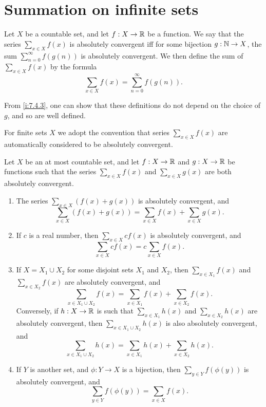 \section{Summation on infinite sets}\label{i:sec:8.2}

\begin{defn}\label{i:8.2.1}
  Let \(X\) be a countable set, and let \(f : X \to \mathbb{R}\) be a function.
  We say that the series \(\sum_{x \in X} f(x)\) is absolutely convergent iff for some bijection \(g : \mathbb{N} \to X\), the sum \(\sum_{n = 0}^\infty f(g(n))\) is absolutely convergent.
  We then define the sum of \(\sum_{x \in X} f(x)\) by the formula
  \[
    \sum_{x \in X} f(x) = \sum_{n = 0}^\infty f(g(n)).
  \]
\end{defn}

\begin{note}
  From \cref{i:7.4.3}, one can show that these definitions do not depend on the choice of \(g\), and so are well defined.
\end{note}

\begin{note}
  For finite sets \(X\) we adopt the convention that series \(\sum_{x \in X} f(x)\) are automatically considered to be absolutely convergent.
\end{note}

\begin{ac}\label{i:ac:8.2.1}
  Let \(X\) be an at most countable set, and let \(f : X \to \mathbb{R}\) and \(g : X \to \mathbb{R}\) be functions such that the series \(\sum_{x \in X} f(x)\) and \(\sum_{x \in X} g(x)\) are both absolutely convergent.
  \begin{enumerate}
    \item The series \(\sum_{x \in X} (f(x) + g(x))\) is absolutely convergent, and
          \[
            \sum_{x \in X} (f(x) + g(x)) = \sum_{x \in X} f(x) + \sum_{x \in X} g(x).
          \]
    \item If \(c\) is a real number, then \(\sum_{x \in X} cf(x)\) is absolutely convergent, and
          \[
            \sum_{x \in X} cf(x) = c \sum_{x \in X} f(x).
          \]
    \item If \(X = X_1 \cup X_2\) for some disjoint sets \(X_1\) and \(X_2\), then \(\sum_{x \in X_1} f(x)\) and \\
          \(\sum_{x \in X_2} f(x)\) are absolutely convergent, and
          \[
            \sum_{x \in X_1 \cup X_2} f(x) = \sum_{x \in X_1} f(x) + \sum_{x \in X_2} f(x).
          \]
          Conversely, if \(h : X \to \mathbb{R}\) is such that \(\sum_{x \in X_1} h(x)\) and \(\sum_{x \in X_2} h(x)\) are absolutely convergent, then \(\sum_{x \in X_1 \cup X_2} h(x)\) is also absolutely convergent, and
          \[
            \sum_{x \in X_1 \cup X_2} h(x) = \sum_{x \in X_1} h(x) + \sum_{x \in X_2} h(x).
          \]
    \item If \(Y\) is another set, and \(\phi : Y \to X\) is a bijection, then \(\sum_{y \in Y} f(\phi(y))\) is absolutely convergent, and
          \[
            \sum_{y \in Y} f(\phi(y)) = \sum_{x \in X} f(x).
          \]
  \end{enumerate}
\end{ac}

